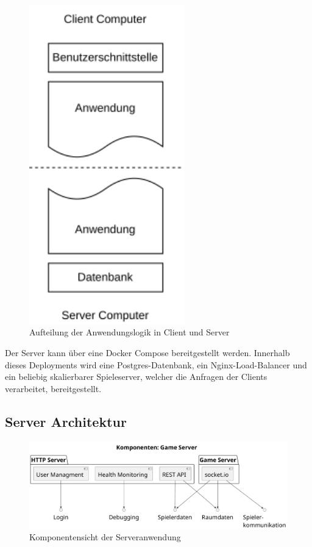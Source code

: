 \documentclass[
]{article}
\begin{document}
\begin{figure}[H]
	\centering
	\includegraphics[width=0.6\textwidth ]{resources/server_client.pdf}
	\caption{Aufteilung der Anwendungslogik in Client und Server}
	\label{fig:destribution-of-logic}
\end{figure}

Der Server kann über eine Docker Compose bereitgestellt werden.
Innerhalb dieses Deployments wird eine Postgres-Datenbank, 
ein Nginx-Load-Balancer und ein beliebig skalierbarer Spieleserver, welcher die Anfragen der Clients verarbeitet, bereitgestellt.

\subsection{Server Architektur}
\begin{figure}[H]
	\centering
	\includegraphics[width=\textwidth ]{resources/game_server.pdf}
	\caption{Komponentensicht der Serveranwendung}
	\label{fig:server}
\end{figure}
\end{document}
